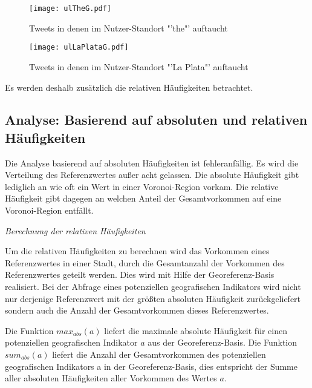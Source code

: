 			\begin{figure} 
				\begin{center}
					\texttt{[image: ulTheG.pdf]}
					\caption{Tweets in denen im Nutzer-Standort "'the"' auftaucht}
					\label{img:ULThe}
					\end{center}
				\end{figure}
			\begin{figure}

			\begin{center}
					\texttt{[image: ulLaPlataG.pdf]}
					\caption{Tweets in denen im Nutzer-Standort "'La Plata"' auftaucht}
					\label{img:ULlaPlata}
				\end{center}
			\end{figure}	


			Es werden deshalb zusätzlich die relativen Häufigkeiten betrachtet.	

		\subsection{Analyse: Basierend auf absoluten und relativen Häufigkeiten} \label{sub:Analyse-absRel} 

			Die Analyse basierend auf absoluten Häufigkeiten ist fehleranfällig. 
			Es wird die Verteilung des Referenzwertes außer acht gelassen.
			Die absolute Häufigkeit gibt lediglich an wie oft ein Wert in einer Voronoi-Region vorkam.
			Die relative Häufigkeit gibt dagegen an welchen Anteil der Gesamtvorkommen auf eine Voronoi-Region entfällt.

			\textit{Berechnung der relativen Häufigkeiten}  

				Um die relativen Häufigkeiten zu berechnen wird das Vorkommen eines Referenzwertes in einer Stadt, durch die Gesamtanzahl der Vorkommen des Referenzwertes geteilt werden.
				Dies wird mit Hilfe der Georeferenz-Basis realisiert.
				Bei der Abfrage eines potenziellen geografischen Indikators wird nicht nur derjenige Referenzwert mit der größten absoluten Häufigkeit zurückgeliefert sondern auch die Anzahl der Gesamtvorkommen dieses Referenzwertes.

				Die Funktion $max_{abs}(a)$ liefert die maximale absolute Häufigkeit für einen potenziellen geografischen Indikator $a$ aus der Georeferenz-Basis.
				Die Funktion $sum_{abs}(a)$ liefert die Anzahl der Gesamtvorkommen des potenziellen geografischen Indikators a in der Georeferenz-Basis, dies entspricht der Summe aller absoluten Häufigkeiten aller Vorkommen des Wertes $a$.

